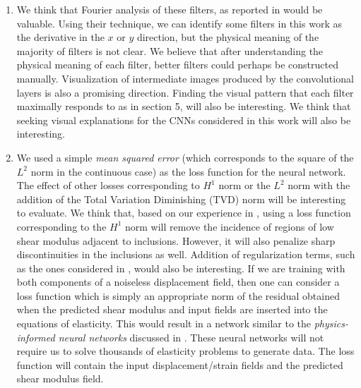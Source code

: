 \documentclass[12pt]{article}
\begin{document}
\begin{enumerate}
\item{We think that Fourier analysis of these filters, as reported in \cite{paper:pateloberai2019} would be valuable. Using their technique, we can identify some filters in this work as the derivative in the $x$ or $y$ direction, but the physical meaning of the majority of filters is not clear. We believe that after understanding the physical meaning of each filter, better filters could perhaps be constructed manually. Visualization of intermediate images produced by the convolutional layers is also a promising direction. Finding the visual pattern that each filter maximally responds to as in \cite{book:chollet} section 5, will also be interesting. We think that seeking visual explanations \cite{paper:selvaraju_2019} for the CNNs considered in this work will also be interesting.}
\item{We used a simple \textit{mean squared error} (which corresponds to the square of the $L^2$ norm in the continuous case) as the loss function for the neural network. The effect of other losses corresponding to $H^1$ norm or the $L^2$ norm with the addition of the Total Variation Diminishing (TVD) norm will be interesting to evaluate. We think that, based on our experience in \cite{diss:gokhale2007}, using a loss function corresponding to the $H^1$ norm will remove the incidence of regions of low shear modulus adjacent to inclusions. However, it will also penalize sharp discontinuities in the inclusions as well. Addition of regularization terms, such as the ones considered in \cite{diss:gokhale2007}, would also be interesting. If we are training with both components of a noiseless displacement field, then one can consider a loss function which is simply an appropriate norm of the  residual obtained when the predicted shear modulus and input fields are inserted into the equations of elasticity. This would result in a network similar to the \textit{physics-informed neural networks} discussed in \cite{paper:pinnkarniadakis}. These neural networks will not require us to solve thousands of elasticity problems to generate data. The loss function will contain the input displacement/strain fields and the predicted shear modulus field.}

\end{enumerate}
\end{document}
